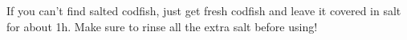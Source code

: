 \begin{recipe}
\hint
{
If you can't find salted codfish, just get fresh codfish and leave it covered in salt for about 1h. Make sure to rinse all the extra salt before using!
}


\end{recipe}


